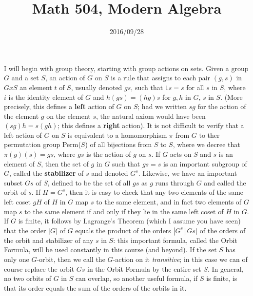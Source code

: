 \documentclass[10pt]{article}
\title{Math 504, Modern Algebra}
\date{2016/09/28}
\begin{document}
\maketitle

I will begin with group theory, starting with group actions on sets.
Given a group $G$ and a set $S$, an action of $G$ on $S$ is a rule that
assigns to each pair $(g,s)$ in $G x S$ an element $t$ of $S$, usually
denoted $gs$, such that $1s = s$ for all $s$ in $S$, where $i$ is the
identity element of $G$ and $h(gs) = (hg)s$ for $g,h$ in $G$, $s$ in
$S$. (More precisely, this defines a \textbf{left} action of $G$ on $S$;
had we written $sg$ for the action of the element $g$ on the element
$s$, the natural axiom would have been $(sg)h = s(gh)$; this defines a
\textbf{right} action). It is not difficult to verify that a left action
of $G$ on $S$ is equivalent to a homomorphism $\pi$ from $G$ to ther
permutation group Perm($S$) of all bijections from $S$ to $S$, where we
decree that $\pi(g)(s) = gs$, where $gs$ is the action of $g$ on $s$. If
$G$ acts on $S$ and $s$ is an element of $S$, then the set of $g$ in $G$
such that $gs = s$ is an important subgroup of $G$, called the
\textbf{stabilizer} of $s$ and denoted $G^s$. Likewise, we have an
important subset $Gs$ of $S$, defined to be the set of all $gs$ as $g$
runs through $G$ and called the orbit of $s$. If $H = G^s$, then it is
easy to check that any two elements of the same left coset $gH$ of $H$
in $G$ map $s$ to the same element, and in fact two elements of $G$ map
$s$ to the same element if and only if they lie in the same left coset
of $H$ in $G$. If $G$ is finite, it follows by Lagrange's Theorem (which
I assume you have seen) that the order $|G|$ of $G$ equals the product
of the orders $|G^s||Gs|$ of the orders of the orbit and stabilizer of
any $s$ in $S$: this important formula, called the Orbit Formula, will
be used constantly in this course (and beyond). If the set $S$ has only
one $G$-orbit, then we call the $G$-action on it {\sl transitive}; in
this case we can of course replace the orbit $Gs$ in the Orbit Formula
by the entire set $S$. In general, no two orbits of $G$ in $S$ can
overlap, so another useful formula, if $S$ is finite, is that its order
equals the sum of the orders of the orbits in it.
\end{document}
